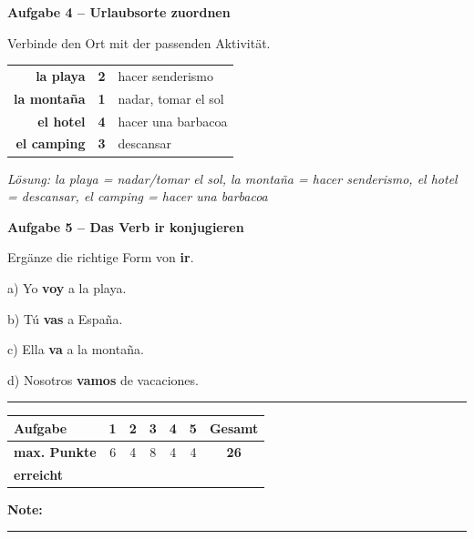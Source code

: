 \documentclass[11pt, a4paper]{article}
\newcommand{\fachfarbe}{spanisch}
\newcommand{\punktebox}[1]{\hfill\fbox{\small \_/#1}}
\newcommand{\luecke}[1]{\rule{#1}{0.4pt}}
\newcommand{\lsg}[1]{\textcolor{loesung}{\textbf{#1}}}
\newenvironment{aufgabe}[1]{%
    \needspace{5\baselineskip}%
    \nopagebreak[4]%
    \vspace{10pt}
    \noindent\textbf{\textcolor{\fachfarbe}{Aufgabe #1}}
    \nopagebreak[4]%
    \vspace{5pt}
    \nopagebreak[4]%
    \begin{list}{}{\leftmargin=0pt}
    \item[]
}{%
    \end{list}
}
\newcommand{\es}[1]{\textcolor{\fachfarbe}{\textbf{#1}}}
\begin{document}
\begin{aufgabe}{4 -- Urlaubsorte zuordnen}
Verbinde den Ort mit der passenden Aktivität. \punktebox{4}
\end{aufgabe}

\begin{center}
\begin{tabular}{rcl}
\es{la playa} & \lsg{2} & hacer senderismo \\[0.8em]
\es{la montaña} & \lsg{1} & nadar, tomar el sol \\[0.8em]
\es{el hotel} & \lsg{4} & hacer una barbacoa \\[0.8em]
\es{el camping} & \lsg{3} & descansar \\
\end{tabular}
\end{center}

\textit{Lösung: la playa = nadar/tomar el sol, la montaña = hacer senderismo, el hotel = descansar, el camping = hacer una barbacoa}

\vspace{15pt}


\begin{aufgabe}{5 -- Das Verb \es{ir} konjugieren}
Ergänze die richtige Form von \es{ir}. \punktebox{4}
\end{aufgabe}

\noindent
a) Yo \lsg{voy} a la playa.

\vspace{0.8em}

\noindent
b) Tú \lsg{vas} a España.

\vspace{0.8em}

\noindent
c) Ella \lsg{va} a la montaña.

\vspace{0.8em}

\noindent
d) Nosotros \lsg{vamos} de vacaciones.


\vspace{25pt}
\hrule
\vspace{10pt}

\noindent
\begin{tabularx}{\textwidth}{|X|c|c|c|c|c||c|}
\hline
\textbf{Aufgabe} & 1 & 2 & 3 & 4 & 5 & \textbf{Gesamt} \\
\hline
\textbf{max. Punkte} & 6 & 4 & 8 & 4 & 4 & \textbf{26} \\
\hline
\textbf{erreicht} & & & & & & \\[0.8em]
\hline
\end{tabularx}

\vspace{10pt}

\begin{flushright}
\textbf{Note:} \luecke{2cm}
\end{flushright}
\end{document}
